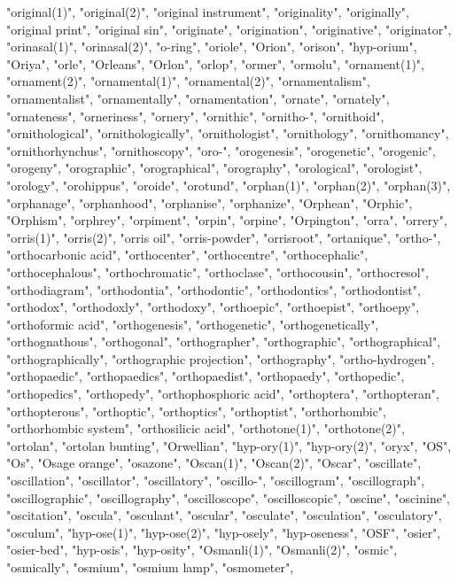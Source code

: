 "original(1)",
"original(2)",
"original instrument",
"originality",
"originally",
"original print",
"original sin",
"originate",
"origination",
"originative",
"originator",
"orinasal(1)",
"orinasal(2)",
"o-ring",
"oriole",
"Orion",
"orison",
"hyp-orium",
"Oriya",
"orle",
"Orleans",
"Orlon",
"orlop",
"ormer",
"ormolu",
"ornament(1)",
"ornament(2)",
"ornamental(1)",
"ornamental(2)",
"ornamentalism",
"ornamentalist",
"ornamentally",
"ornamentation",
"ornate",
"ornately",
"ornateness",
"orneriness",
"ornery",
"ornithic",
"ornitho-",
"ornithoid",
"ornithological",
"ornithologically",
"ornithologist",
"ornithology",
"ornithomancy",
"ornithorhynchus",
"ornithoscopy",
"oro-",
"orogenesis",
"orogenetic",
"orogenic",
"orogeny",
"orographic",
"orographical",
"orography",
"orological",
"orologist",
"orology",
"orohippus",
"oroide",
"orotund",
"orphan(1)",
"orphan(2)",
"orphan(3)",
"orphanage",
"orphanhood",
"orphanise",
"orphanize",
"Orphean",
"Orphic",
"Orphism",
"orphrey",
"orpiment",
"orpin",
"orpine",
"Orpington",
"orra",
"orrery",
"orris(1)",
"orris(2)",
"orris oil",
"orris-powder",
"orrisroot",
"ortanique",
"ortho-",
"orthocarbonic acid",
"orthocenter",
"orthocentre",
"orthocephalic",
"orthocephalous",
"orthochromatic",
"orthoclase",
"orthocousin",
"orthocresol",
"orthodiagram",
"orthodontia",
"orthodontic",
"orthodontics",
"orthodontist",
"orthodox",
"orthodoxly",
"orthodoxy",
"orthoepic",
"orthoepist",
"orthoepy",
"orthoformic acid",
"orthogenesis",
"orthogenetic",
"orthogenetically",
"orthognathous",
"orthogonal",
"orthographer",
"orthographic",
"orthographical",
"orthographically",
"orthographic projection",
"orthography",
"ortho-hydrogen",
"orthopaedic",
"orthopaedics",
"orthopaedist",
"orthopaedy",
"orthopedic",
"orthopedics",
"orthopedy",
"orthophosphoric acid",
"orthoptera",
"orthopteran",
"orthopterous",
"orthoptic",
"orthoptics",
"orthoptist",
"orthorhombic",
"orthorhombic system",
"orthosilicic acid",
"orthotone(1)",
"orthotone(2)",
"ortolan",
"ortolan bunting",
"Orwellian",
"hyp-ory(1)",
"hyp-ory(2)",
"oryx",
"OS",
"Os",
"Osage orange",
"osazone",
"Oscan(1)",
"Oscan(2)",
"Oscar",
"oscillate",
"oscillation",
"oscillator",
"oscillatory",
"oscillo-",
"oscillogram",
"oscillograph",
"oscillographic",
"oscillography",
"oscilloscope",
"oscilloscopic",
"oscine",
"oscinine",
"oscitation",
"oscula",
"osculant",
"oscular",
"osculate",
"osculation",
"osculatory",
"osculum",
"hyp-ose(1)",
"hyp-ose(2)",
"hyp-osely",
"hyp-oseness",
"OSF",
"osier",
"osier-bed",
"hyp-osis",
"hyp-osity",
"Osmanli(1)",
"Osmanli(2)",
"osmic",
"osmically",
"osmium",
"osmium lamp",
"osmometer",
